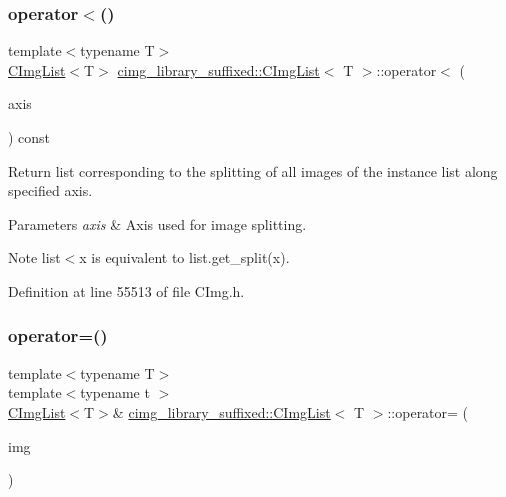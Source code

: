 \subsubsection{\texorpdfstring{operator$<$()}{operator<()}}
{\footnotesize\ttfamily template$<$typename T$>$ \\
\hyperlink{structcimg__library__suffixed_1_1CImgList}{C\+Img\+List}$<$T$>$ \hyperlink{structcimg__library__suffixed_1_1CImgList}{cimg\+\_\+library\+\_\+suffixed\+::\+C\+Img\+List}$<$ T $>$\+::operator$<$ (\begin{DoxyParamCaption}\item[{const \hyperlink{classchar}{char}}]{axis }\end{DoxyParamCaption}) const\hspace{0.3cm}{\ttfamily [inline]}}



Return list corresponding to the splitting of all images of the instance list along specified axis. 


\begin{DoxyParams}{Parameters}
{\em axis} & Axis used for image splitting. \\
\hline
\end{DoxyParams}
\begin{DoxyNote}{Note}
{\ttfamily list$<$\textquotesingle{}x\textquotesingle{}} is equivalent to {\ttfamily list.\+get\+\_\+split(\textquotesingle{}x\textquotesingle{})}. 
\end{DoxyNote}


Definition at line 55513 of file C\+Img.\+h.

\mbox{\label{structcimg__library__suffixed_1_1CImgList_afd4e6df51f7e4f5d30cf3ce638c3d704}} 
\subsubsection{\texorpdfstring{operator=()}{operator=()}\hspace{0.1cm}{\footnotesize\ttfamily [1/4]}}
{\footnotesize\ttfamily template$<$typename T$>$ \\
template$<$typename t $>$ \\
\hyperlink{structcimg__library__suffixed_1_1CImgList}{C\+Img\+List}$<$T$>$\& \hyperlink{structcimg__library__suffixed_1_1CImgList}{cimg\+\_\+library\+\_\+suffixed\+::\+C\+Img\+List}$<$ T $>$\+::operator= (\begin{DoxyParamCaption}\item[{const \hyperlink{structcimg__library__suffixed_1_1CImg}{C\+Img}$<$ t $>$ \&}]{img }\end{DoxyParamCaption})\hspace{0.3cm}{\ttfamily [inline]}}



